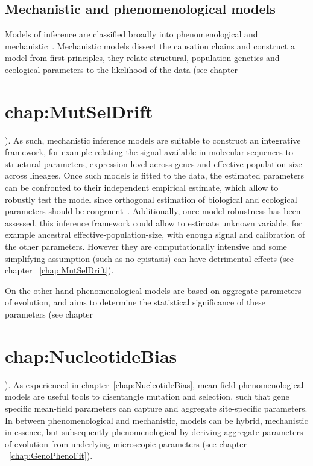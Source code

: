 \section{Mechanistic and phenomenological models}
\label{sec:mechanistic-and-phenomenological-models}

Models of inference are classified broadly into phenomenological and mechanistic~\citep{Rodrigue2010a}.
Mechanistic models dissect the causation chains and construct a model from first principles, they relate structural, population-genetics and ecological parameters to the \gls{likelihood} of the data (see chapter \chapter*{chap:MutSelDrift}).
As such, mechanistic inference models are suitable to construct an integrative framework, for example relating the signal available in molecular sequences to structural parameters, expression level across genes and \gls{effective-population-size} across lineages.
Once such models is fitted to the data, the estimated parameters can be confronted to their independent empirical estimate, which allow to robustly test the model since orthogonal estimation of biological and ecological parameters should be congruent~\citep{Dasmeh2014}.
Additionally, once model robustness has been assessed, this inference framework could allow to estimate unknown variable, for example ancestral \gls{effective-population-size}, with enough signal and calibration of the other parameters.
However they are computationally intensive and some simplifying assumption (such as no epistasis) can have detrimental effects (see chapter ~\ref{chap:MutSelDrift}).

On the other hand phenomenological models are based on aggregate parameters of evolution, and aims to determine the statistical significance of these parameters (see chapter \chapter*{chap:NucleotideBias}).
As experienced in chapter~\ref{chap:NucleotideBias}, mean-field phenomenological models are useful tools to disentangle mutation and selection, such that gene specific mean-field parameters can capture and aggregate site-specific parameters.
In between phenomenological and mechanistic, models can be hybrid, mechanistic in essence, but subsequently phenomenological by deriving aggregate parameters of evolution from underlying microscopic parameters (see chapter ~\ref{chap:GenoPhenoFit}).

